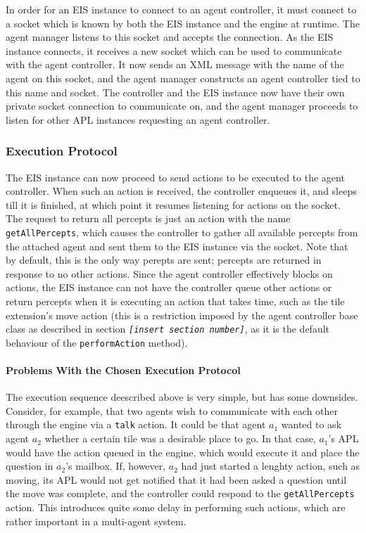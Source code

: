In order for an EIS instance to connect to an agent controller, it
must connect to a socket which is known by both the EIS instance and
the engine at runtime. The agent manager listens to this socket and
accepts the connection. As the EIS instance connects, it receives
a new socket which can be used to communicate with the agent controller.
It now sends an XML message with the name of the agent on this socket,
and the agent manager constructs an agent controller tied to this
name and socket. The controller and the EIS instance now have their
own private socket connection to communicate on, and the agent manager
proceeds to listen for other APL instances requesting an agent controller.


\subsubsection*{Execution Protocol}

The EIS instance can now proceed to send actions to be executed to
the agent controller. When such an action is received, the controller
enqueues it, and sleeps till it is finished, at which point it resumes
listening for actions on the socket. The request to return all percepts
is just an action with the name \texttt{getAllPercepts}, which causes
the controller to gather all available percepts from the attached
agent and sent them to the EIS instance via the socket. Note that
by default, this is the only way perepts are sent; percepts are returned
in response to no other actions. Since the agent controller effectively
blocks on actions, the EIS instance can not have the controller queue
other actions or return percepts when it is executing an action that
takes time, such as the tile extension's move action (this is a restriction
imposed by the agent controller base class as described in section
\texttt{\emph{{[}insert section number{]}}}, as it is the default
behaviour of the \texttt{performAction} method).


\paragraph*{Problems With the Chosen Execution Protocol}

The execution sequence deescribed above is very simple, but has some
downsides. Consider, for example, that two agents wish to communicate
with each other through the engine via a \texttt{talk} action. It
could be that agent $a_{1}$ wanted to ask agent $a_{2}$ whether
a certain tile was a desirable place to go. In that case, $a_{1}$'s
APL would have the action queued in the engine, which would execute
it and place the question in $a_{2}$'s mailbox. If, however, $a_{2}$
had just started a lenghty action, such as moving, its APL would not
get notified that it had been asked a question until the move was
complete, and the controller could respond to the \texttt{getAllPercepts}
action. This introduces quite some delay in performing such actions,
which are rather important in a multi-agent system. 

